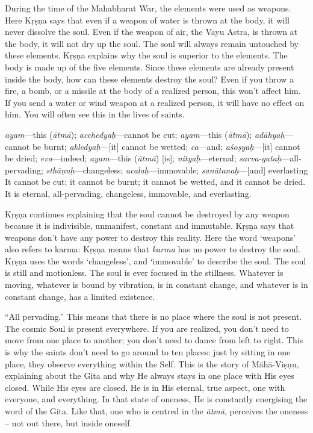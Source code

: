 During the time of the Mahabharat War, the elements were used as weapons. Here Kṛṣṇa says that even if a weapon of water is thrown at the body, it will never dissolve the soul. Even if the weapon of air, the Vayu Astra, is thrown at the body, it will not dry up the soul. The soul will always remain untouched by these elements. Kṛṣṇa explains why the soul is superior to the elements. The body is made up of the five elements. Since these elements are already present inside the body, how can these elements destroy the soul? Even if you throw a fire, a bomb, or a missile at the body of a realized person, this won’t affect him. If you send a water or wind weapon at a realized person, it will have no effect on him. You will often see this in the lives of saints. 

{%
  \textit{ayam}---this (\textit{ātmā}); 
  \textit{acchedyaḥ}---cannot be cut; 
  \textit{ayam}---this (\textit{ātmā}); 
  \textit{adāhyaḥ}---cannot be burnt; 
  \textit{akledyaḥ}---[it] cannot be wetted; 
  \textit{ca}---and; 
  \textit{aśoṣyaḥ}---[it] cannot be dried; 
  \textit{eva}---indeed; 
  \textit{ayam}---this (\textit{ātmā}) [is]; 
  \textit{nityaḥ}---eternal; 
  \textit{sarva-gataḥ}---all-pervading; 
  \textit{sthāṇuḥ}---changeless; 
  \textit{acalaḥ}---immovable; 
  \textit{sanātanaḥ}---[and] everlasting
}
{%
  It cannot be cut; it cannot be burnt; it cannot be wetted, and it cannot be dried. It is eternal, all-pervading, changeless, immovable, and everlasting.
}

Kṛṣṇa continues explaining that the soul cannot be destroyed by any weapon because it is indivisible, unmanifest, constant and immutable. Kṛṣṇa says that weapons don’t have any power to destroy this reality. Here the word ‘weapons’ also refers to karma: Kṛṣṇa means that \textit{karma} has no power to destroy the soul. Kṛṣṇa uses the words ‘changeless’, and ‘immovable’ to describe the soul. The soul is still and motionless. The soul is ever focused in the stillness. Whatever is moving, whatever is bound by vibration, is in constant change, and whatever is in constant change, has a limited existence.

“All pervading.” This means that there is no place where the soul is not present. The cosmic Soul is present everywhere. If you are realized, you don’t need to move from one place to another; you don’t need to dance from left to right. This is why the saints don’t need to go around to ten places: just by sitting in one place, they observe everything within the Self. This is the story of Māhā-Viṣṇu, explaining about the Gita and why He always stays in one place with His eyes closed. While His eyes are closed, He is in His eternal, true aspect, one with everyone, and everything. In that state of oneness, He is constantly energising the word of the Gita. Like that, one who is centred in the \textit{ātmā}, perceives the oneness – not out there, but inside oneself.

